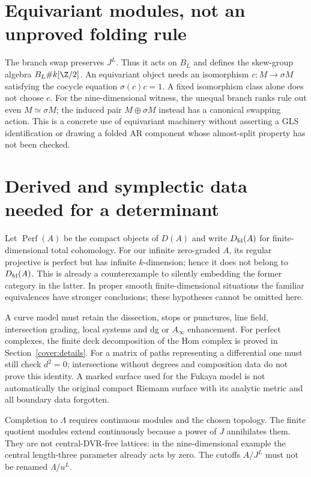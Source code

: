 \documentclass[11pt,oneside,openany]{book}
\theoremstyle{definition}\newtheorem{definition}[theorem]{Definition}
\theoremstyle{remark}\newtheorem{remark}[theorem]{Remark}
\begin{document}
\section{Equivariant modules, not an unproved folding rule}
The branch swap preserves $J^L$. Thus it acts on $B_L$ and defines the
skew-group algebra $B_L\# k[\Z/2]$. An equivariant object needs an
isomorphism $c:M\to\sigma M$ satisfying the cocycle equation
$\sigma(c)c=1$. A fixed isomorphism class alone does not choose $c$.
For the nine-dimensional witness, the unequal branch ranks rule out even
$M\simeq\sigma M$; the induced pair $M\oplus\sigma M$ instead has a
canonical swapping action. This is a concrete use of equivariant machinery
without asserting a GLS identification or drawing a folded AR component
whose almost-split property has not been checked.

\section{Derived and symplectic data needed for a determinant}
Let $\operatorname{Perf}(A)$ be the compact objects of $D(A)$ and write
$D_{\rm fd}(A)$ for finite-dimensional total cohomology. For our infinite
zero-graded $A$, its regular projective is perfect but has infinite
$k$-dimension; hence it does not belong to $D_{\rm fd}(A)$. This is already
a counterexample to silently embedding the former category in the latter.
In proper smooth finite-dimensional situations the familiar equivalences
have stronger conclusions; these hypotheses cannot be omitted here.

A curve model must retain the dissection, stops or punctures, line field,
intersection grading, local systems and dg or $A_\infty$ enhancement.
For perfect complexes, the finite deck decomposition of the Hom complex is
proved in Section~\ref{cover:details}. For a matrix of paths representing a
differential one must still check $d^2=0$; intersections without degrees and
composition data do not prove this identity. A marked surface used for the
Fukaya model is not automatically the original compact Riemann surface
with its analytic metric and all boundary data forgotten.

Completion to $\Lambda$ requires continuous modules and the chosen topology.
The finite quotient modules extend continuously because a power of $J$
annihilates them. They are not central-DVR-free lattices: in the
nine-dimensional example the central length-three parameter already acts
by zero. The cutoffs $A/J^L$ must not be renamed $\Lambda/u^L$.
\end{document}
